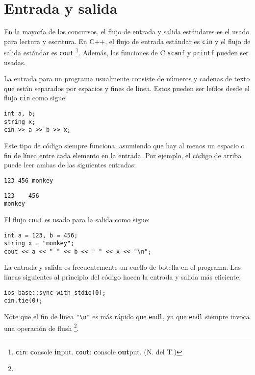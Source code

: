 \section{Entrada y salida}


En la mayor\'ia de los concursos, el flujo de entrada y salida
est\'andares es el usado para lectura y escritura.
En C++, el flujo de entrada est\'andar es
\texttt{cin} y el flujo de salida est\'andar es \texttt{cout}
\footnote{\texttt{cin}: \textbf{c}onsole \textbf{in}put.
\texttt{cout}: \textbf{c}onsole \textbf{out}put. (N. del T.)}.
Adem\'as, las funciones de C \texttt{scanf} y \texttt{printf}
pueden ser usadas.

La entrada para un programa usualmente consiste
de n\'umeros y cadenas de texto que est\'an separados
por espacios y fines de l\'inea.
Estos pueden ser le\'idos desde el flujo \texttt{cin}
como sigue:

\begin{lstlisting}
int a, b;
string x;
cin >> a >> b >> x;
\end{lstlisting}

Este tipo de c\'odigo siempre funciona,
asumiendo que hay al menos un espacio
o fin de l\'inea entre cada elemento en
la entrada. Por ejemplo, el c\'odigo de arriba
puede leer ambas de las siguientes entradas:

\begin{lstlisting}
123 456 monkey
\end{lstlisting}
\begin{lstlisting}
123    456
monkey
\end{lstlisting}
El flujo \texttt{cout} es usado para la salida
como sigue:
\begin{lstlisting}
int a = 123, b = 456;
string x = "monkey";
cout << a << " " << b << " " << x << "\n";
\end{lstlisting}

La entrada y salida es frecuentemente un cuello
de botella en el programa. Las l\'ineas siguientes
al principio del c\'odigo hacen la entrada y
salida m\'as eficiente:

\begin{lstlisting}
ios_base::sync_with_stdio(0);
cin.tie(0);
\end{lstlisting}

Note que el fin de l\'inea \texttt{"\textbackslash n"}
es m\'as r\'apido que \texttt{endl},
ya que \texttt{endl} siempre invoca una operaci\'on
de flush \footnote{
}.

